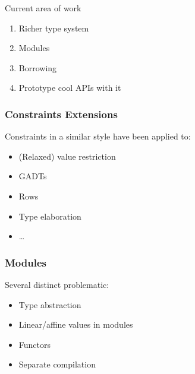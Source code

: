\documentclass[xcolor=svgnames,11pt]{beamer}
\begin{document}
\begin{frame}{Current area of work}

  \begin{enumerate}
  \item Richer type system
  \item Modules
  \item Borrowing
  \item Prototype cool APIs with it
  \end{enumerate}

\end{frame}

\begin{frame}
  \frametitle{Constraints \hfill Extensions}
  Constraints in a similar style have been applied to:
  \begin{itemize}
  \item (Relaxed) value restriction
  \item GADTs
  \item Rows
  \item Type elaboration
  \item \dots
  \end{itemize}
\end{frame}

\begin{frame}
  \frametitle{Modules}

  Several distinct problematic:
  \begin{itemize}
  \item \alert<2>{Type abstraction} 
  \item \alert<3>{Linear/affine values in modules} 
  \item \alert<4>{Functors}
  \item \alert<5->{Separate compilation}
  \end{itemize}

\end{frame}
\end{document}
